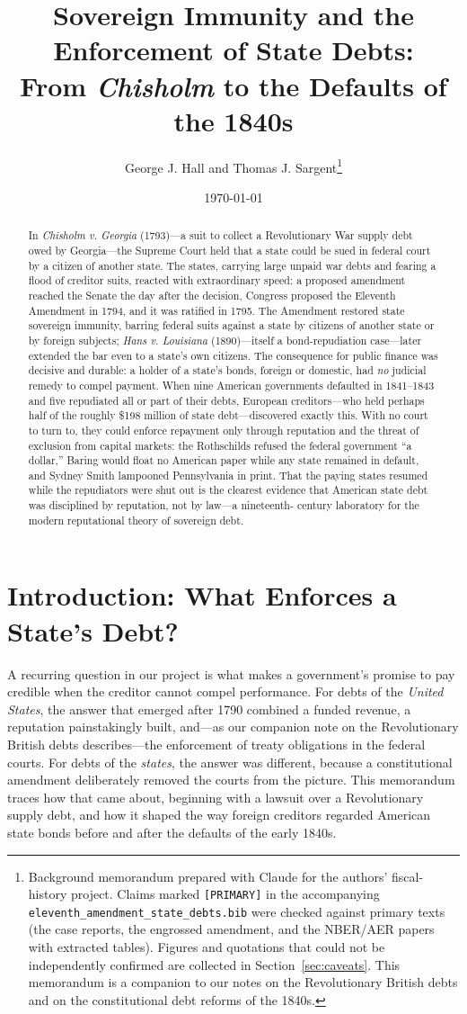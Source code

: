 \documentclass[12pt]{article}
\title{Sovereign Immunity and the Enforcement of State Debts:\\
From \emph{Chisholm} to the Defaults of the 1840s}
\author{George J. Hall and Thomas J. Sargent\thanks{Background memorandum
prepared with Claude for the authors' fiscal-history project. Claims marked
\texttt{[PRIMARY]} in the accompanying \texttt{eleventh\_amendment\_state\_debts.bib}
were checked against primary texts (the case reports, the engrossed amendment,
and the NBER/AER papers with extracted tables). Figures and quotations that could
not be independently confirmed are collected in Section~\ref{sec:caveats}. This
memorandum is a companion to our notes on the Revolutionary British debts and on
the constitutional debt reforms of the 1840s.}}
\date{\today}
\begin{document}
\maketitle

\begin{abstract}
In \emph{Chisholm v. Georgia} (1793)---a suit to collect a Revolutionary War
supply debt owed by Georgia---the Supreme Court held that a state could be sued in
federal court by a citizen of another state. The states, carrying large unpaid war
debts and fearing a flood of creditor suits, reacted with extraordinary speed: a
proposed amendment reached the Senate the day after the decision, Congress
proposed the Eleventh Amendment in 1794, and it was ratified in 1795. The
Amendment restored state sovereign immunity, barring federal suits against a state
by citizens of another state or by foreign subjects; \emph{Hans v. Louisiana}
(1890)---itself a bond-repudiation case---later extended the bar even to a state's
own citizens. The consequence for public finance was decisive and durable: a
holder of a state's bonds, foreign or domestic, had \emph{no} judicial remedy to
compel payment. When nine American governments defaulted in 1841--1843 and five
repudiated all or part of their debts, European creditors---who held perhaps half
of the roughly \$198 million of state debt---discovered exactly this. With no
court to turn to, they could enforce repayment only through reputation and the
threat of exclusion from capital markets: the Rothschilds refused the federal
government ``a dollar,'' Baring would float no American paper while any state
remained in default, and Sydney Smith lampooned Pennsylvania in print. That the
paying states resumed while the repudiators were shut out is the clearest evidence
that American state debt was disciplined by reputation, not by law---a nineteenth-
century laboratory for the modern reputational theory of sovereign debt.
\end{abstract}

\section{Introduction: What Enforces a State's Debt?}

A recurring question in our project is what makes a government's promise to pay
credible when the creditor cannot compel performance. For debts of the
\emph{United States}, the answer that emerged after 1790 combined a funded revenue,
a reputation painstakingly built, and---as our companion note on the Revolutionary
British debts describes---the enforcement of treaty obligations in the federal
courts. For debts of the \emph{states}, the answer was different, because a
constitutional amendment deliberately removed the courts from the picture. This
memorandum traces how that came about, beginning with a lawsuit over a
Revolutionary supply debt, and how it shaped the way foreign creditors regarded
American state bonds before and after the defaults of the early 1840s.
\end{document}
